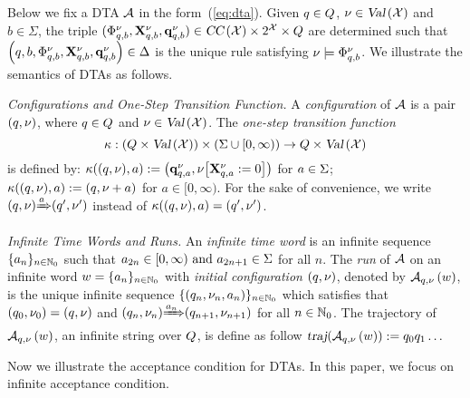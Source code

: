 Below we fix a DTA $\mathcal{A}$ in the form~(\ref{eq:dta}). Given $q\in Q$, $\nu\in\mbox{\sl Val}\left(\mathcal{X}\right)$ and $b\in\Sigma$, the triple $(\Phi_{q,b}^{\nu},\mathbf{X}_{q,b}^{\nu},\mathbf{q}_{q,b}^{\nu})\in\mbox{\sl CC}\left(\mathcal{X}\right)\times 2^{\mathcal{X}}\times Q$ are determined such that $\left(q,b,\Phi_{q,b}^{\nu},\mathbf{X}_{q,b}^{\nu},\mathbf{q}_{q,b}^{\nu}\right)\in\Delta$ is the unique rule satisfying $\nu\models \Phi_{q,b}^{\nu}$.
We illustrate the semantics of DTAs as follows.

{\em Configurations and One-Step Transition Function.}
A \emph{configuration} of $\mathcal{A}$ is a pair $(q,\nu)$, where $q\in Q$ and $\nu\in\mbox{\sl Val}\left(\mathcal{X}\right)$.
The \emph{one-step transition function}
\[
    \kappa
        :
        (Q \times \mbox{\sl Val}\left(\mathcal{X}\right)) \times (\Sigma\cup [0,\infty))
        \rightarrow
        Q \times \mbox{\sl Val}\left(\mathcal{X}\right)
\]
is defined by: 
$
    \kappa((q,\nu),a)
        := \left(
            \mathbf{q}_{q,a}^{\nu},{\nu}{\left[\mathbf{X}_{q,a}^{\nu}:=0\right]}
        \right)
$ for $a \in \Sigma$; 
$
    \kappa((q,\nu),a)
        :=(
            q,\nu+a
        )
$ for $a \in [0,\infty)$.
For the sake of convenience, we write ${(q,\nu)}{\xRightarrow{a}}{(q',\nu')}$
instead of $\kappa((q,\nu),a)=(q',\nu')$.

{\em Infinite Time Words and Runs.}
An \emph{infinite time word} is an infinite sequence $\{a_n\}_{n\in\mathbb{N}_0}$ such that 
$
    a_{2n}      \in [0,\infty)
    \mbox{ and }
    a_{2n+1}    \in \Sigma
$
for all $n$.
The \emph{run} of $\mathcal{A}$ on an infinite word $w=\{a_n\}_{n\in\mathbb{N}_0}$
with \emph{initial configuration} $(q,\nu)$, denoted by ${\mathcal{A}}_{q,\nu}\left(w\right)$, is the unique infinite
sequence $\{\left(q_n,\nu_n,a_n\right)\}_{n\in\mathbb{N}_0}$
which satisfies that $(q_0,\nu_0)=(q,\nu)$ and ${(q_n,\nu_n)}{\xRightarrow{a_n}}{(q_{n+1},\nu_{n+1})}$
for all $n\in\mathbb{N}_0$.
The trajectory of ${\mathcal{A}}_{q,\nu}\left(w\right)$, an infinite string over $Q$,
is define as follow $\mbox{\sl traj} (  {\mathcal{A}}_{q,\nu}\left(w\right)  ) := q_0 q_1 \dots$

Now we illustrate the acceptance condition for DTAs. In this paper, we focus on infinite acceptance condition. 

